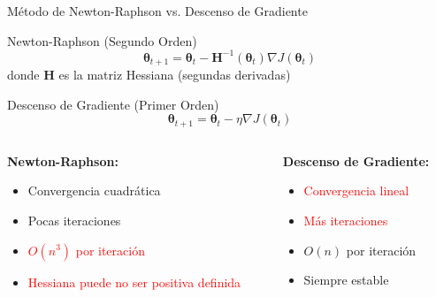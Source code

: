 \documentclass[10pt]{beamer}
\begin{document}
\begin{frame}{Método de Newton-Raphson vs. Descenso de Gradiente}
\begin{block}{Newton-Raphson (Segundo Orden)}
$$\boldsymbol{\theta}_{t+1} = \boldsymbol{\theta}_t - \mathbf{H}^{-1}(\boldsymbol{\theta}_t) \nabla J(\boldsymbol{\theta}_t)$$
donde $\mathbf{H}$ es la matriz Hessiana (segundas derivadas)
\end{block}

\begin{block}{Descenso de Gradiente (Primer Orden)}
$$\boldsymbol{\theta}_{t+1} = \boldsymbol{\theta}_t - \eta \nabla J(\boldsymbol{\theta}_t)$$
\end{block}

\begin{columns}
\begin{column}{0.5\textwidth}
\textbf{Newton-Raphson:}
\begin{itemize}
\item \textcolor{verdeClaro}{Convergencia cuadrática}
\item \textcolor{verdeClaro}{Pocas iteraciones}
\item \textcolor{red}{$O(n^3)$ por iteración}
\item \textcolor{red}{Hessiana puede no ser positiva definida}
\end{itemize}
\end{column}
\begin{column}{0.5\textwidth}
\textbf{Descenso de Gradiente:}
\begin{itemize}
\item \textcolor{red}{Convergencia lineal}
\item \textcolor{red}{Más iteraciones}
\item \textcolor{verdeClaro}{$O(n)$ por iteración}
\item \textcolor{verdeClaro}{Siempre estable}
\end{itemize}
\end{column}
\end{columns}
\end{frame}
\end{document}
